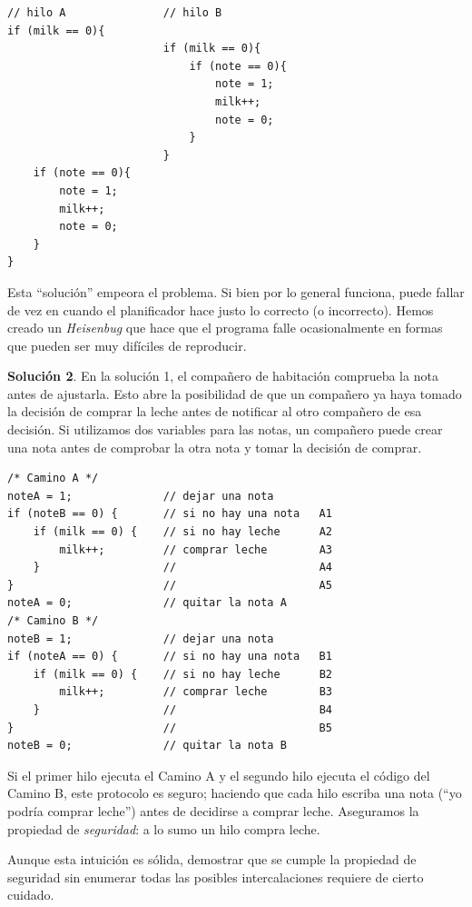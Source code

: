 \documentclass[10pt]{book}
\begin{document}
\begin{lstlisting}
// hilo A				// hilo B
if (milk == 0){
						if (milk == 0){
							if (note == 0){
								note = 1;
								milk++;
								note = 0;
							}
						}
	if (note == 0){
		note = 1;
		milk++;
		note = 0;
	}
}
\end{lstlisting}

Esta ``solución'' empeora el problema. Si bien por lo general funciona, puede fallar de vez en cuando el planificador hace justo lo correcto (o incorrecto). Hemos creado un \textit{Heisenbug} que hace que el programa falle ocasionalmente en formas que pueden ser muy difíciles de reproducir.

\textbf{Solución 2}. En la solución 1, el compañero de habitación comprueba la nota antes de ajustarla. Esto abre la posibilidad de que un compañero ya haya tomado la decisión de comprar la leche antes de notificar al otro compañero de esa decisión. Si utilizamos dos variables para las notas, un compañero puede crear una nota antes de comprobar la otra nota y tomar la decisión de comprar.

\begin{lstlisting}
/* Camino A */
noteA = 1; 				// dejar una nota
if (noteB == 0) {		// si no hay una nota 	A1
	if (milk == 0) { 	// si no hay leche		A2
		milk++; 		// comprar leche 		A3
	}					//						A4
}						//						A5
noteA = 0;				// quitar la nota A
/* Camino B */
noteB = 1; 				// dejar una nota
if (noteA == 0) {		// si no hay una nota 	B1
	if (milk == 0) { 	// si no hay leche		B2
		milk++; 		// comprar leche 		B3
	}					//						B4
}						//						B5
noteB = 0;				// quitar la nota B
\end{lstlisting}

Si el primer hilo ejecuta el {\mf Camino A} y el segundo hilo ejecuta el código del {\mf Camino B}, este protocolo es seguro; haciendo que cada hilo escriba una nota (``yo podría comprar leche'') antes de decidirse a comprar leche. Aseguramos la propiedad de \textit{seguridad}: a lo sumo un hilo compra leche.

Aunque esta intuición es sólida, demostrar que se cumple la propiedad de seguridad sin enumerar todas las posibles intercalaciones  requiere de cierto cuidado.
\end{document}
